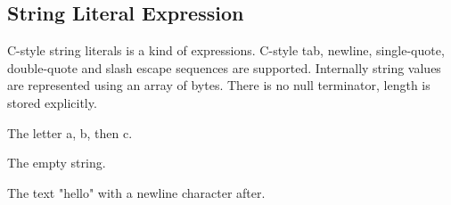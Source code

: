 
\subsection{String Literal Expression}
{
	C-style string literals is a kind of expressions.
	C-style tab, newline, single-quote, double-quote and slash escape sequences
	are supported. Internally string values are represented using an array of
	bytes. There is no null terminator, length is stored explicitly.
	
	\begin{itemize}
	{
		\item[\texttt{"abc"}] The letter a, b, then c.
		
		\item[\texttt{""}] The empty string.
		
		\item[\texttt{"hello\symbol{92}n"}] The text "hello" with a newline
			character after.
	}
	\end{itemize}
}
